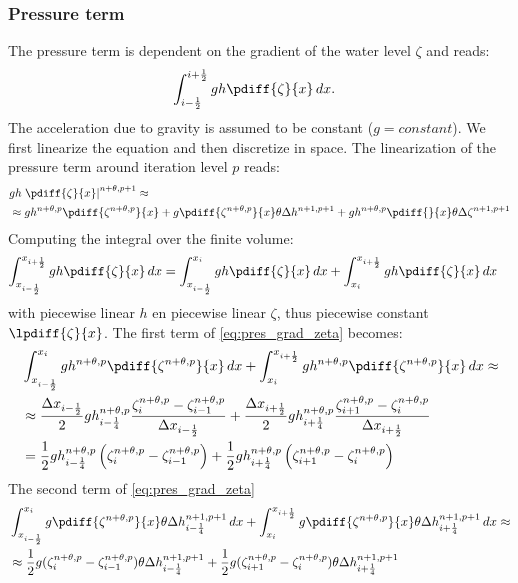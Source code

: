 \subsubsection{Pressure term} \label{sec:pressure_dependent_on_zeta}
The pressure term is dependent on the gradient of the water level $\zeta$ and reads:
\begin{align}
    & \int_{i-\half}^{i+\half} gh\pdiff{\zeta}{x} \,dx.
\end{align}
The acceleration due to gravity is assumed to be constant ($g={\mathit{constant}}$).
We first linearize the equation and then discretize in space.
The linearization of the pressure term around iteration level $p$ reads:
\begin{align}
    & g h \left. \pdiff{\zeta}{x} \right|^{n+\theta,p+1}  \approx
    \\
    & \approx g h^{n+\theta,p} \pdiff{\zeta^{n+\theta,p}}{x} +
    g \pdiff{\zeta^{n+\theta,p}}{x} \theta\Delta h^{n+1, p+1} +
    g h^{n+\theta,p} \pdiff{}{x} \theta\Delta \zeta^{n+1, p+1} \label{eq:pres_grad_zeta}
\end{align}
Computing the integral over the finite volume:
\begin{align}
    \int_{x_{i-\half}}^{x_{i+\half}} gh\pdiff{\zeta}{x} \,dx & = \int_{x_{i-\half}}^{x_{i}} gh\pdiff{\zeta}{x} \,dx +
    \int_{x_{i}}^{x_{i+\half}} gh\pdiff{\zeta}{x} \,dx
    \label{eq:pres_grad_zeta_fv}
\end{align}
with piecewise linear $h$ en piecewise linear $\zeta$, thus piecewise constant $\lpdiff{\zeta}{x}$.
The first term of \autoref{eq:pres_grad_zeta} becomes:
\begin{align}
    & \int_{x_{i-\half}}^{x_{i}} g h^{n+\theta,p} \pdiff{\zeta^{n+\theta,p}}{x} \,dx +
    \int_{x_{i}}^{x_{i+\half}} g h^{n+\theta,p} \pdiff{\zeta^{n+\theta,p}}{x} \,dx \approx
    \nonumber \\*
    & \approx \frac{\Dx_{i-\half}}{2}  g  h^{n+\theta,p}_{i-\quart} \frac{\zeta^{n+\theta,p}_i- \zeta^{n+\theta,p}_{i-1}}{\Dx_{i-\half}} +
    \frac{\Dx_{i+\half}}{2} g h^{n+\theta,p}_{i+\quart} \frac{\zeta^{n+\theta,p}_{i+1} - \zeta^{n+\theta,p}_{i}}{\Dx_{i+\half}}
    \\
    & = \half g h^{n+\theta,p}_{i-\quart} \left(\zeta^{n+\theta,p}_i- \zeta^{n+\theta,p}_{i-1}\right)
    +
    \half g h^{n+\theta,p}_{i+\quart} \left(\zeta^{n+\theta,p}_{i+1} - \zeta^{n+\theta,p}_{i}\right)
\end{align}
The second term of \autoref{eq:pres_grad_zeta}
\begin{align}
    & \int_{x_{i-\half}}^{x_{i}} g \pdiff{\zeta^{n+\theta,p}}{x} \theta \Delta h^{n+1, p+1}_{i-\quart} \, dx +
    \int_{x_{i}}^{x_{i+\half}} g \pdiff{\zeta^{n+\theta,p}}{x} \theta \Delta h^{n+1, p+1}_{i+\quart} \,dx \approx
    \\
    & \approx
     \half  g  (\zeta^{n+\theta,p}_{i}- \zeta^{n+\theta,p}_{i-1}) \theta\Delta h^{n+1, p+1}_{i-\quart} +
     \half g (\zeta^{n+\theta,p}_{i+1} - \zeta^{n+\theta,p}_{i}) \theta\Delta h^{n+1, p+1}_{i+\quart}
\end{align}
